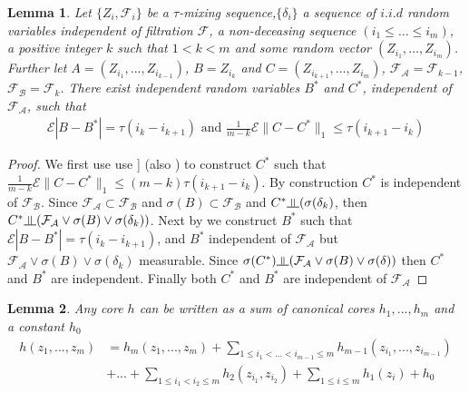 \documentclass{article} %
\newtheorem{lemma}{Lemma}
\newcommand{\indep}{\rotatebox[origin=c]{90}{$\models$}}
\newcommand{\ev}{\mathcal{E}}
\begin{document}
\begin{lemma}
\label{lem:complicated}
Let $\{Z_i,\mathcal{F}_i\}$ be a $\tau$-mixing sequence,$\{ \delta_i \}$ a sequence of $i.i.d$ random variables independent of filtration $\mathcal{F}$, a non-deceasing sequence $(i_1\leq ... \leq i_m)$, a positive integer $k$ such that $1 < k<m$ and some random vector $(Z_{i_1},...,Z_{i_m})$. Further let $A = (Z_{i_1},...,Z_{i_{k-1}})$, $B= Z_{i_k}$ and $C=(Z_{i_{k+1}},...,Z_{i_{m}})$,  $\mathcal{F_A} =\mathcal{F}_{k-1}$, $\mathcal{F_B}  =\mathcal{F}_{k}$. There exist independent random variables $B^*$ and $C^*$, independent of $\mathcal{F_A}$, such that  
\begin{align}
\ev |B-B^*| = \tau(i_{k} -i_{k+1}) \text{ and } \frac{1} {m-k} \ev \parallel C-C^* \parallel_1 \leq \tau(i_{k+1}-i_k) 
\end{align}    
\end{lemma}


\begin{proof}
We first use use  \cite[Equation 2.1]{leucht_dependent_2013}] (also \cite[Lemma 5.3]{dedecker2007weak}) to construct $C^*$ such that $\frac{1} {m-k}  \ev \parallel C-C^* \parallel_1 \leq (m-k) \tau(i_{k+1}-i_k)$. By construction $C^*$ is independent of $\mathcal{F_B}$. Since $ \mathcal{F_A} \subset \mathcal{F_B}$ and $ \sigma(B) \subset \mathcal{F_B}$ and $C^* \indep (\sigma(\delta_k) $, then $C^* \indep  (\mathcal{F_A} \vee \sigma(B)  \vee \sigma(\delta_k)  )$. Next by \cite[Lemma 5.2]{dedecker2007weak} we construct $B^*$  such  that $\ev |B-B^*| = \tau(i_{k} -i_{k+1})$, and $B^*$  independent  of $\mathcal{F_A}$ but $\mathcal{F_A} \vee \sigma(B) \vee \sigma(\delta_k)$ measurable. Since   $\sigma(C^*) \indep (\mathcal{F_A} \vee \sigma(B) \vee \sigma(\delta)) $ then $C^*$ and $B^*$ are independent. Finally both $C^*$ and $B^*$ are independent of $\mathcal{F_A}$   
\end{proof}

\begin{lemma}
\label{lem:Components}\cite[Section 5.1.5]{serfling80}
Any core $h$ can be written as a sum of canonical cores $h_1,...,h_m$ and a constant $h_0$
\begin{align*}
h(z_1,...,z_m) &=   h_m(z_1,...,z_m) + \sum_{1 \leq i_1 < ...<i_{m-1} \leq m } h_{m-1}(z_{i_1},...,z_{i_{m-1}}) \\ 
    & + ... + \sum_{1 \leq i_1 < i_2 \leq m } h_2(z_{i_1},z_{i_2}) + \sum_{1 \leq i \leq m} h_1(z_i)+h_0
\end{align*} 
\end{lemma}
\end{document}
